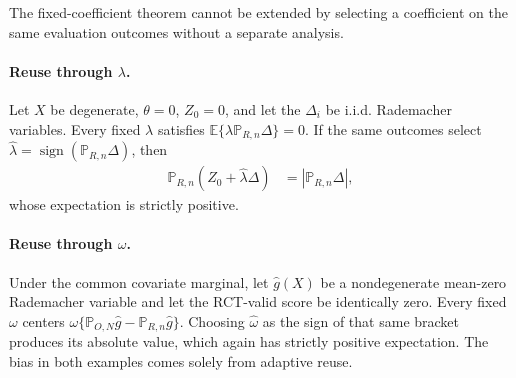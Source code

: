 The fixed-coefficient theorem cannot be extended by selecting a coefficient on
the same evaluation outcomes without a separate analysis.

\paragraph{Reuse through $\lambda$.}
Let $X$ be degenerate, $\theta=0$, $Z_0=0$, and let the $\Delta_i$ be i.i.d. Rademacher variables. Every fixed $\lambda$ satisfies $\mathbb E\{\lambda\mathbb P_{R,n}\Delta\}=0$. If the same outcomes select $\widehat\lambda=\operatorname{sign}(\mathbb P_{R,n}\Delta)$, then
\begin{align*}
\mathbb P_{R,n}(Z_0+\widehat\lambda\Delta)
&=|\mathbb P_{R,n}\Delta|,
\end{align*}
whose expectation is strictly positive.

\paragraph{Reuse through $\omega$.}
Under the common covariate marginal, let $\widehat{g}(X)$ be a nondegenerate mean-zero Rademacher variable and let the RCT-valid score be identically zero. Every fixed $\omega$ centers $\omega\{\mathbb P_{O,N}\widehat{g}-\mathbb P_{R,n}\widehat{g}\}$. Choosing $\widehat\omega$ as the sign of that same bracket produces its absolute value, which again has strictly positive expectation. The bias in both examples comes solely from adaptive reuse.
